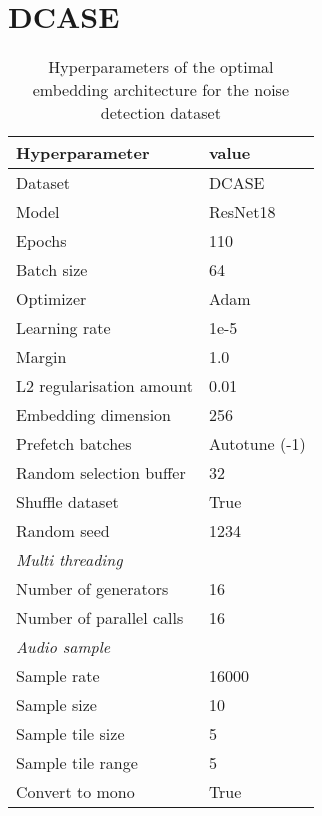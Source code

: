\section{DCASE}
\label{app:detailed-hyperparameters-dcase}
\begin{table}[ht]
    \centering
    \caption{Hyperparameters of the optimal embedding architecture for the noise detection dataset}
	\label{tab:Hyperparameters-Detailed-DCASE}
    \begin{tabular}{l|l}
        \toprule
        \textbf{Hyperparameter} & \textbf{value} \\ 
        \midrule[1pt]
        Dataset & DCASE \\
        \hline
        Model & ResNet18 \\ 
        \hline
        Epochs & 110 \\ 
        \hline
        Batch size & 64 \\ 
        \hline
        Optimizer & Adam \\ 
        \hline
        Learning rate & 1e-5 \\
        \hline
        Margin & 1.0 \\
        \hline
        L2 regularisation amount & 0.01 \\
        \hline
        Embedding dimension & 256 \\
        \hline
        Prefetch batches & Autotune (-1) \\ 
        \hline
        Random selection buffer & 32 \\ 
        \hline
        Shuffle dataset & True \\
        \hline
        Random seed & 1234 \\
        \midrule[1pt]
        \multicolumn{2}{l}{\textit{Multi threading}} \\
        \midrule[1pt]
        Number of generators & 16 \\ 
        \hline
        Number of parallel calls & 16 \\
        \midrule[1pt]
        \multicolumn{2}{l}{\textit{Audio sample}} \\
        \midrule[1pt]
        Sample rate & 16000 \\ 
        \hline
        Sample size & 10 \\
        \hline
        Sample tile size & 5 \\
        \hline
        Sample tile range & 5 \\
        \hline
        Convert to mono & True \\

\end{tabular}
\end{table}
